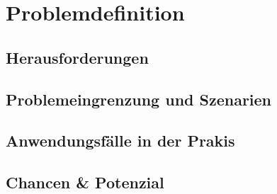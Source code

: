 \section{Problemdefinition}
\newpage

\subsection{Herausforderungen}
\newpage

\subsection{Problemeingrenzung und Szenarien}
\newpage

\subsection{Anwendungsfälle in der Prakis}
\newpage

\subsection{Chancen \& Potenzial}
\newpage
